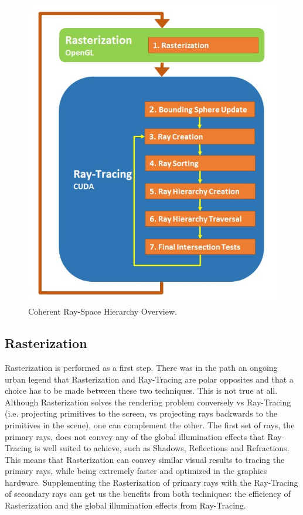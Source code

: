 \documentclass{egpubl}
\begin{document}
\begin{figure}
    \centering
    \includegraphics[scale=0.50]{Images/Overview.jpg}
    \caption{\label{fig:crsh}Coherent Ray-Space Hierarchy Overview.}
\end{figure}

\subsection{Rasterization}

Rasterization is performed as a first step. There was in the path an ongoing urban legend that Rasterization and Ray-Tracing are polar opposites and that a choice has to be made between these two techniques. This is not true at all. Although Rasterization solves the rendering problem conversely vs Ray-Tracing (i.e. projecting primitives to the screen, vs projecting rays backwards to the primitives in the scene), one can complement the other. The first set of rays, the primary rays, does not convey any of the global illumination effects that Ray-Tracing is well suited to achieve, such as Shadows, Reflections and Refractions. This means that Rasterization can convey similar visual results to tracing the primary rays, while being extremely faster and optimized in the graphics hardware. Supplementing the Rasterization of primary rays with the Ray-Tracing of secondary rays can get us the benefits from both techniques: the efficiency of Rasterization and the global illumination effects from Ray-Tracing.
\end{document}
